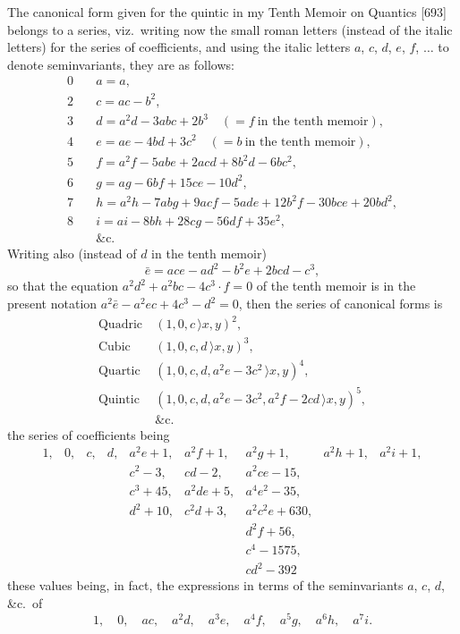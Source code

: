\documentclass[11pt,a4paper]{article}
\begin{document}
\thispagestyle{plain}
\noindent The canonical form given for the quintic in my Tenth Memoir on Quantics [693] belongs to a series, viz.\ writing now the small roman letters (instead of the italic letters) for the series of coefficients, and using the italic letters $a$, $c$, $d$, $e$, $f$, $\ldots$ to denote seminvariants, they are as follows:
\begin{align*}
0\quad & a = a,\\
2\quad & c = ac - b^{2},\\
3\quad & d = a^{2}d - 3abc + 2b^{3}\quad (= f\ \text{in the tenth memoir}),\\
4\quad & e = ae - 4bd + 3c^{2}\quad (= b\ \text{in the tenth memoir}),\\
5\quad & f = a^{2}f - 5abe + 2acd + 8b^{2}d - 6bc^{2},\\
6\quad & g = ag - 6bf + 15ce - 10d^{2},\\
7\quad & h = a^{2}h - 7abg + 9acf - 5ade + 12b^{2}f - 30bce + 20bd^{2},\\
8\quad & i = ai - 8bh + 28cg - 56df + 35e^{2},\\
       & \&\text{c}.
\end{align*}
Writing also (instead of $d$ in the tenth memoir)
\[
\bar{e} = ace - ad^{2} - b^{2}e + 2bcd - c^{3},
\]
so that the equation $a^{2}d^{2} + a^{2}bc - 4c^{3}\cdot f = 0$ of the tenth memoir is in the present notation $a^{2}\bar{e} - a^{2}ec + 4c^{3} - d^{2} = 0$, then the series of canonical forms is
\begin{align*}
\text{Quadric}&\ (1, 0, c\,\rangle x, y)^{2},\\
\text{Cubic}  &\ (1, 0, c, d\,\rangle x, y)^{3},\\
\text{Quartic}&\ (1, 0, c, d, a^{2}e - 3c^{2}\,\rangle x, y)^{4},\\
\text{Quintic}&\ (1, 0, c, d, a^{2}e - 3c^{2}, a^{2}f - 2cd\,\rangle x, y)^{5},\\
              &\ \&\text{c}.
\end{align*}
the series of coefficients being
\[
\begin{array}{ccccccccc}
1, & 0, & c, & d, & a^{2}e+1,  & a^{2}f+1,  & a^{2}g+1,        & a^{2}h+1, & a^{2}i+1,\\
   &    &    &    & c^{2}-3,   & cd-2,      & a^{2}ce-15,      &           &          \\
   &    &    &    & c^{3}+45,  & a^{2}de+5, & a^{4}e^{2}-35,   &           &          \\
   &    &    &    & d^{2}+10,  & c^{2}d+3,  & a^{2}c^{2}e+630, &           &          \\
   &    &    &    &            &            & d^{2}f+56,       &           &          \\
   &    &    &    &            &            & c^{4}-1575,      &           &          \\
   &    &    &    &            &            & cd^{2}-392       &           &
\end{array}
\]
these values being, in fact, the expressions in terms of the seminvariants $a$, $c$, $d$, \&c.\ of
\[
1,\quad 0,\quad ac,\quad a^{2}d,\quad a^{3}e,\quad a^{4}f,\quad a^{5}g,\quad a^{6}h,\quad a^{7}i.
\]
\clearpage
\end{document}
